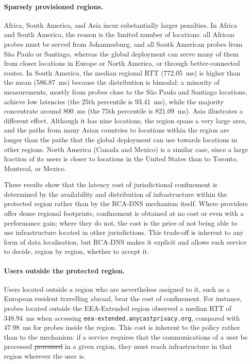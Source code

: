 \documentclass[
A4paper,                %
twoside,                %
openright,              %
chapterprefix=true,     %
12pt,                   %
headings=normal,        %
titlepage=on            %
]{book}
\makeatletter
\providecommand{\DIFdeltex}[1]{{\protect\color{red}\sout{#1}}} %
\providecommand{\DIFdelbegin}{} %
\providecommand{\DIFdelend}{} %
\providecommand{\DIFdel}[1]{\texorpdfstring{\DIFdeltex{#1}}{}} %
\providecommand{\DIFscaledelfig}{0.5}
\newlength{\DIFdelgraphicswidth} %
\newlength{\DIFdelgraphicsheight} %
\providecommand{\DIFdelincludegraphics}[2][]{%
\sbox{\DIFdelgraphicsbox}{\DIFOincludegraphics[#1]{#2}}%
\settoboxwidth{\DIFdelgraphicswidth}{\DIFdelgraphicsbox} %
\settoboxtotalheight{\DIFdelgraphicsheight}{\DIFdelgraphicsbox} %
\scalebox{\DIFscaledelfig}{%
\parbox[b]{\DIFdelgraphicswidth}{\usebox{\DIFdelgraphicsbox}\\[-\baselineskip] \rule{\DIFdelgraphicswidth}{0em}}\llap{\resizebox{\DIFdelgraphicswidth}{\DIFdelgraphicsheight}{%
\setlength{\unitlength}{\DIFdelgraphicswidth}%
\begin{picture}(1,1)%
\thicklines\linethickness{2pt} %
{\color[rgb]{1,0,0}\put(0,0){\framebox(1,1){}}}%
{\color[rgb]{1,0,0}\put(0,0){\line( 1,1){1}}}%
{\color[rgb]{1,0,0}\put(0,1){\line(1,-1){1}}}%
\end{picture}%
}\hspace*{3pt}}} %
} %
\DeclareRobustCommand{\DIFdelbegin}{\DIFOdelbegin \let\includegraphics\DIFdelincludegraphics} %
\DeclareRobustCommand{\DIFdelend}{\DIFOaddend \let\includegraphics\DIFOincludegraphics} %
\let\sout@orig\sout %
\renewcommand{\sout}[1]{\ifmmode\text{\sout@orig{\ensuremath{#1}}}\else\sout@orig{#1}\fi} %
\makeatother
\begin{document}
\paragraph{Sparsely provisioned regions.} Africa, South America, and Asia incur substantially larger penalties. In Africa and South America, the reason is the limited number of locations: all African probes must be served from Johannesburg, and all South American probes from São Paulo or Santiago, whereas the global deployment can serve many of them from closer locations in Europe or North America, or through better-connected routes. In South America, the median regional RTT (772.05~ms) is higher than the mean (586.87~ms) because the distribution is bimodal: a minority of measurements, mostly from probes close to the São Paulo and Santiago locations, achieve low latencies (the 25th percentile is 93.41~ms), while the majority concentrate around 800~ms (the 75th percentile is 821.09~ms). Asia illustrates a different effect. Although it has nine locations, the region spans a very large area, and the paths from many Asian countries to locations within the region are longer than the paths that the global deployment can use towards locations in other regions. North America (Canada and Mexico) is a similar case, since a large fraction of its users is closer to locations in the United States than to Toronto, Montreal, or Mexico. 

These results show that the latency cost of jurisdictional confinement is determined by the availability and distribution of infrastructure within the protected region rather than by the RCA-DNS mechanism itself. Where providers offer dense regional footprints, confinement is obtained at no cost or even with a performance gain; where they do not, the cost is the price of not being able to use infrastructure located in other jurisdictions. This trade-off is inherent to any form of data localisation, but RCA-DNS makes it explicit and allows each service to decide, region by region, whether to accept it.

\paragraph{Users outside the protected region.} Users located outside a region who are nevertheless assigned to it, such as a European resident travelling abroad, bear the cost of confinement. For instance, probes located outside the EEA-Extended region observed a median RTT of 348.94~ms when accessing \texttt{eea-extended.anycastprivacy.org}, compared with 47.98~ms for probes inside the region. This cost is inherent to the policy rather than to the mechanism: if a service requires that the communications of a user be processed \DIFdelbegin \DIFdel{processed }\DIFdelend in a given region, they must reach infrastructure in that region wherever the user is.
\end{document}
